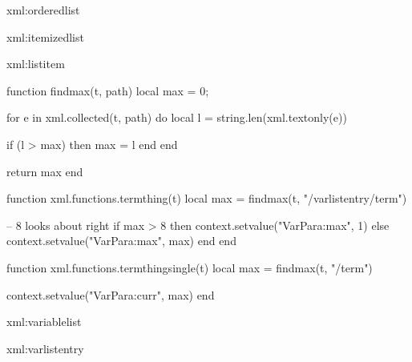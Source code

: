 
\startxmlsetups xml:orderedlist
	\startitemize[n]
	\stopitemize
\stopxmlsetups

\startxmlsetups xml:itemizedlist
	\startitemize[1]
	\stopitemize
\stopxmlsetups

\startxmlsetups xml:listitem
	\item
\stopxmlsetups

\startluacode

function findmax(t, path)
	local max = 0;

	for e in xml.collected(t, path) do
		local l = string.len(xml.textonly(e))

		if (l > max) then
			max = l
		end
	end

	return max
end

function xml.functions.termthing(t)
	local max = findmax(t, "/varlistentry/term")

	-- 8 looks about right
	if max > 8 then
		context.setvalue("VarPara:max", 1)
	else
		context.setvalue("VarPara:max", max)
	end
end

function xml.functions.termthingsingle(t)
	local max = findmax(t, "/term")

	context.setvalue("VarPara:curr", max)
end

\stopluacode

\startxmlsetups xml:variablelist


	\setupparagraphs[VarPara][1][width=\getvalue{VarPara:max}ex]
	\setupparagraphs[VarPara][2][width=]


\stopxmlsetups


\startxmlsetups xml:varlistentry




	\def\TermStuff{\xmlconcat{#1}{/term}{\crlf}}

	\setupparagraphs[VarPara][before={}]

